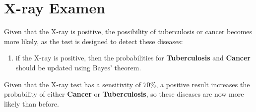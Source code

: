 \documentclass[../CSC_5RO11_TA_TP6.tex]{subfiles}
\begin{document}
\section{X-ray Examen}
\noindent Given that the X-ray is positive, the possibility of tuberculosis or cancer becomes more likely, as the test is designed to detect these diseases:
\begin{enumerate}[noitemsep]
    \item if the X-ray is positive, then the probabilities for \textbf{Tuberculosis} and \textbf{Cancer} should be updated using Bayes' theorem.
\end{enumerate}

\noindent Given that the X-ray test has a sensitivity of $70\%$, a positive result increases the probability of either \textbf{Cancer} or \textbf{Tuberculosis}, so these diseases are now more likely than before.
\end{document}
